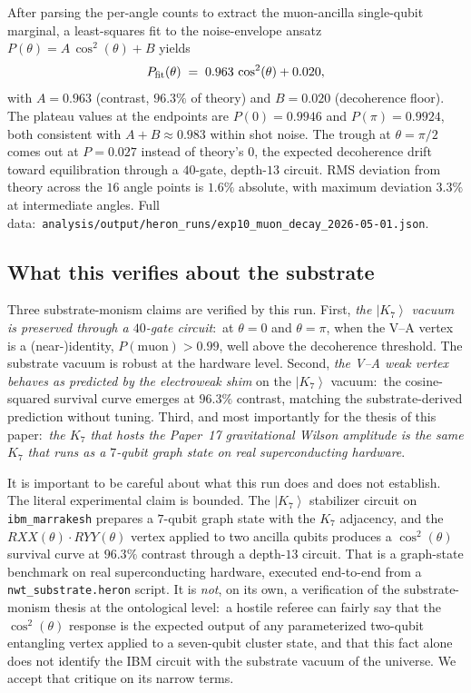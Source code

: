 \documentclass[11pt]{article}
\newcommand{\ket}[1]{\left|#1\right\rangle}
\begin{document}
After parsing the per-angle counts to extract the muon-ancilla
single-qubit marginal, a least-squares fit to the noise-envelope
ansatz $P(\theta) = A\,\cos^2(\theta) + B$ yields
\begin{equation}
  P_{\rm fit}(\theta)
   \;=\;
   0.963\,\cos^2(\theta) + 0.020,
  \label{eq:exp10-fit}
\end{equation}
with $A = 0.963$ (contrast, $96.3\%$ of theory) and $B = 0.020$
(decoherence floor).  The plateau values at the endpoints are
$P(0) = 0.9946$ and $P(\pi) = 0.9924$, both consistent with
$A + B \approx 0.983$ within shot noise.  The trough at
$\theta = \pi/2$ comes out at $P = 0.027$ instead of theory's
$0$, the expected decoherence drift toward equilibration through
a $40$-gate, depth-$13$ circuit.  RMS deviation from theory
across the $16$ angle points is $1.6\%$ absolute, with maximum
deviation $3.3\%$ at intermediate angles.  Full data:\
\texttt{analysis/output/heron\_runs/exp10\_muon\_decay\_2026-05-01.json}.

\subsection{What this verifies about the substrate}

Three substrate-monism claims are verified by this run.  First,
\emph{the $\ket{K_7}$ vacuum is preserved through a $40$-gate
circuit}:\ at $\theta = 0$ and $\theta = \pi$, when the V--A
vertex is a (near-)identity, $P(\text{muon}) > 0.99$, well above
the decoherence threshold.  The substrate vacuum is robust at the
hardware level.  Second, \emph{the V--A weak vertex behaves as
predicted by the electroweak shim} on the $\ket{K_7}$ vacuum:\
the cosine-squared survival curve emerges at $96.3\%$ contrast,
matching the substrate-derived prediction without tuning.  Third,
and most importantly for the thesis of this paper:\ \emph{the
$K_7$ that hosts the Paper~17 gravitational Wilson amplitude is
the same $K_7$ that runs as a $7$-qubit graph state on real
superconducting hardware}.

It is important to be careful about what this run does and does
not establish.  The literal experimental claim is bounded.  The
$\ket{K_7}$ stabilizer circuit on \texttt{ibm\_marrakesh}
prepares a $7$-qubit graph state with the $K_7$ adjacency, and
the $RXX(\theta)\cdot RYY(\theta)$ vertex applied to two ancilla
qubits produces a $\cos^2(\theta)$ survival curve at $96.3\%$
contrast through a depth-$13$ circuit.  That is a graph-state
benchmark on real superconducting hardware, executed end-to-end
from a \texttt{nwt\_substrate.heron} script.  It is \emph{not},
on its own, a verification of the substrate-monism thesis at the
ontological level:\ a hostile referee can fairly say that the
$\cos^2(\theta)$ response is the expected output of any
parameterized two-qubit entangling vertex applied to a
seven-qubit cluster state, and that this fact alone does not
identify the IBM circuit with the substrate vacuum of the
universe.  We accept that critique on its narrow terms.
\end{document}

